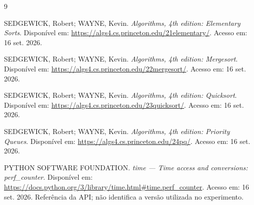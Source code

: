 \documentclass[12pt]{uftex}
\begin{document}
\begin{thebibliography}{9}

 SEDGEWICK, Robert; WAYNE, Kevin. \textit{Algorithms, 4th edition: Elementary Sorts}. Disponível em: \url{https://algs4.cs.princeton.edu/21elementary/}. Acesso em: 16 set. 2026.

 SEDGEWICK, Robert; WAYNE, Kevin. \textit{Algorithms, 4th edition: Mergesort}. Disponível em: \url{https://algs4.cs.princeton.edu/22mergesort/}. Acesso em: 16 set. 2026.

 SEDGEWICK, Robert; WAYNE, Kevin. \textit{Algorithms, 4th edition: Quicksort}. Disponível em: \url{https://algs4.cs.princeton.edu/23quicksort/}. Acesso em: 16 set. 2026.

 SEDGEWICK, Robert; WAYNE, Kevin. \textit{Algorithms, 4th edition: Priority Queues}. Disponível em: \url{https://algs4.cs.princeton.edu/24pq/}. Acesso em: 16 set. 2026.

 PYTHON SOFTWARE FOUNDATION. \textit{time --- Time access and conversions: perf\_counter}. Disponível em: \url{https://docs.python.org/3/library/time.html\#time.perf_counter}. Acesso em: 16 set. 2026. Referência da API; não identifica a versão utilizada no experimento.

\end{thebibliography}
\end{document}
